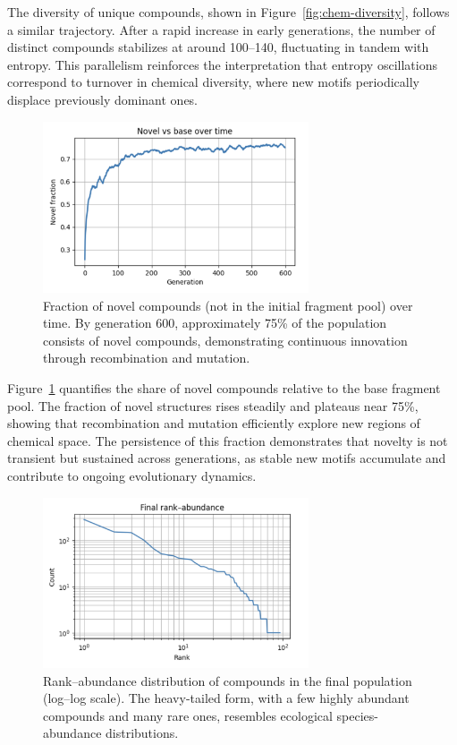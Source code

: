 \documentclass[life,article,submit,pdftex,moreauthors]{Definitions/mdpi}
\begin{document}
The diversity of unique compounds, shown in Figure~\ref{fig:chem-diversity}, follows a similar trajectory. After a rapid increase in early generations, the number of distinct compounds stabilizes at around 100–140, fluctuating in tandem with entropy. This parallelism reinforces the interpretation that entropy oscillations correspond to turnover in chemical diversity, where new motifs periodically displace previously dominant ones.  

\begin{figure}[H]
    \centering
    \includegraphics[width=0.7\textwidth]{SDA-chem-novel.png}
    \caption{Fraction of novel compounds (not in the initial fragment pool) over time. By generation 600, approximately 75\% of the population consists of novel compounds, demonstrating continuous innovation through recombination and mutation.}
    \label{fig:chem-novel}
\end{figure}

Figure~\ref{fig:chem-novel} quantifies the share of novel compounds relative to the base fragment pool. The fraction of novel structures rises steadily and plateaus near 75\%, showing that recombination and mutation efficiently explore new regions of chemical space. The persistence of this fraction demonstrates that novelty is not transient but sustained across generations, as stable new motifs accumulate and contribute to ongoing evolutionary dynamics.  

\begin{figure}[H]
    \centering
    \includegraphics[width=0.7\textwidth]{SDA-chem-rank.png}
    \caption{Rank–abundance distribution of compounds in the final population (log–log scale). The heavy-tailed form, with a few highly abundant compounds and many rare ones, resembles ecological species-abundance distributions.}
    \label{fig:chem-rank}
\end{figure}
\end{document}
